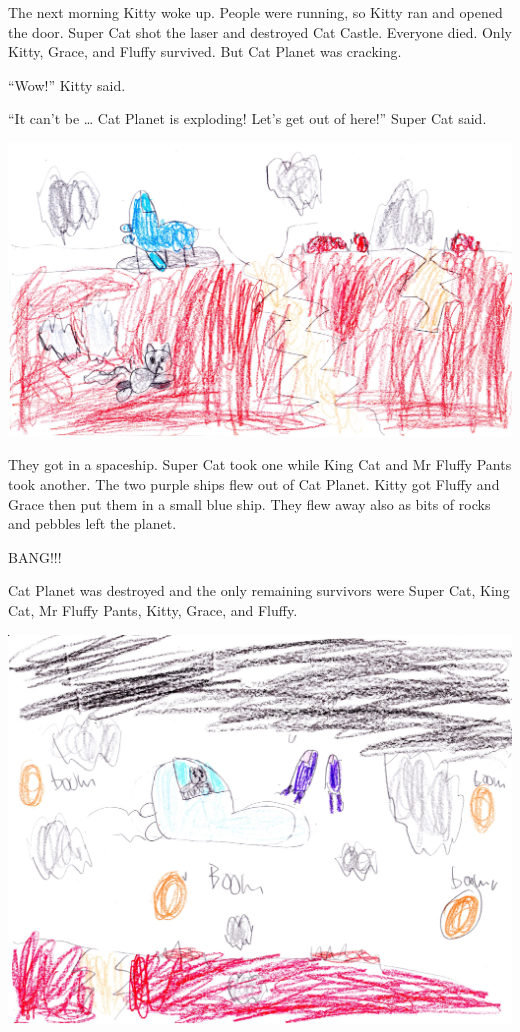\documentclass[]{krantz}
\begin{document}
The next morning Kitty woke up. People were running, so Kitty ran and
opened the door. Super Cat shot the laser and destroyed Cat Castle.
Everyone died. Only Kitty, Grace, and Fluffy survived. But Cat Planet
was cracking.

``Wow!'' Kitty said.

``It can't be \ldots{} Cat Planet is exploding! Let's get out of here!''
Super Cat said.

\includegraphics{img/lava.jpg}

They got in a spaceship. Super Cat took one while King Cat and Mr Fluffy
Pants took another. The two purple ships flew out of Cat Planet. Kitty
got Fluffy and Grace then put them in a small blue ship. They flew away
also as bits of rocks and pebbles left the planet.

BANG!!!

Cat Planet was destroyed and the only remaining survivors were Super
Cat, King Cat, Mr Fluffy Pants, Kitty, Grace, and Fluffy.

\includegraphics{img/flying.jpg}
\end{document}
